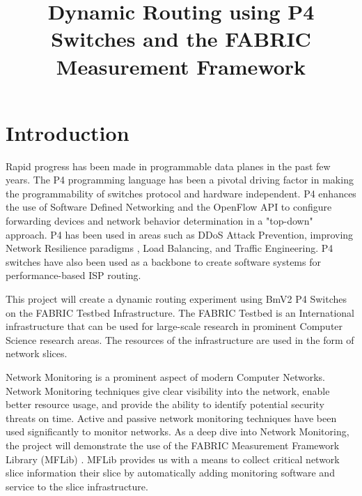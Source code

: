 \documentclass[conference]{IEEEtran}
\begin{document}
\title{Dynamic Routing using P4 Switches and the FABRIC Measurement Framework\\}

\author{
\and
{}
}
\maketitle

\section{Introduction}
Rapid progress has been made in programmable data planes in the past few years. The P4 programming language \cite{b1} has been a pivotal driving factor in making the programmability of switches protocol and hardware independent. P4 enhances the use of Software Defined Networking and the OpenFlow API to configure forwarding devices and network behavior determination in a "top-down" approach. P4 has been used in areas such as DDoS Attack Prevention, improving Network Resilience paradigms \cite{b2}, Load Balancing, and Traffic Engineering. P4 switches have also been used as a backbone to create software systems for performance-based ISP routing.

This project will create a dynamic routing experiment using BmV2 P4 Switches on the FABRIC Testbed Infrastructure. The FABRIC Testbed is an International infrastructure that can be used for large-scale research in prominent Computer Science research areas. The resources of the infrastructure are used in the form of network slices. 

Network Monitoring is a prominent aspect of modern Computer Networks. Network Monitoring techniques give clear visibility into the network, enable better resource usage, and provide the ability to identify potential security threats on time. Active and passive network monitoring techniques have been used significantly to monitor networks. As a deep dive into Network Monitoring, the project will demonstrate the use of the FABRIC Measurement Framework Library (MFLib) \cite{b3}. MFLib provides us with a means to collect critical network slice information their slice by automatically adding monitoring software and service to the slice infrastructure. 
\end{document}
